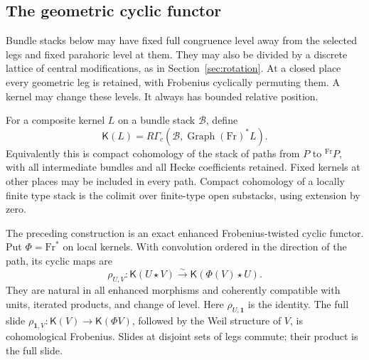 \subsection{The geometric cyclic functor}

Bundle stacks below may have fixed full congruence level away from
the selected legs and fixed parahoric level at them. They may also
be divided by a discrete lattice of central modifications, as in
Section~\ref{sec:rotation}. At a closed place every geometric leg
is retained, with Frobenius cyclically permuting them. A kernel
may change these levels. It always has bounded relative position.

For a composite kernel $L$ on a bundle stack $\mathcal B$, define
\[
 \mathsf K(L)=R\Gamma_c(\mathcal B,
                     \operatorname{Graph}(\mathrm{Fr})^*L).
\]
Equivalently this is compact cohomology of the stack of paths from
$P$ to ${}^{\mathrm{Fr}} P$, with all intermediate bundles and all Hecke
coefficients retained. Fixed kernels at other places may be
included in every path. Compact cohomology of a locally finite
type stack is the colimit over finite-type open substacks, using
extension by zero.

\begin{proposition}\label{cat:cyclic}
The preceding construction is an exact enhanced Frobenius-twisted
cyclic functor. Put $\Phi=\mathrm{Fr}^*$ on local kernels. With convolution
ordered in the direction of the path, its cyclic maps are
\begin{equation}\label{cat:last-first}
 \rho_{U,V}:\mathsf K(U\star V)
       \xrightarrow{\sim}\mathsf K(\Phi(V)\star U).
\end{equation}
They are natural in all enhanced morphisms and coherently
compatible with units, iterated products, and change of level.
Here $\rho_{U,\mathbf1}$ is the identity. The full slide
$\rho_{\mathbf1,V}:\mathsf K(V)\to\mathsf K(\Phi V)$,
followed by the Weil structure of $V$, is cohomological
Frobenius. Slides at disjoint sets of legs commute; their product
is the full slide.
\end{proposition}

